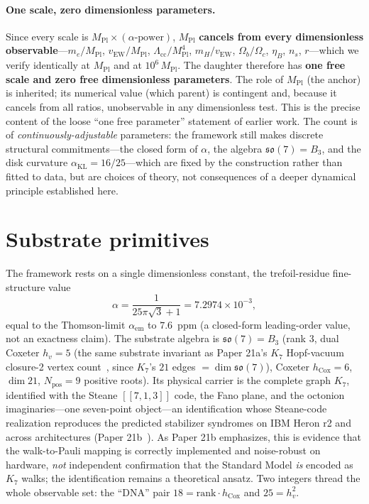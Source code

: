 \documentclass[11pt]{article}
\newcommand{\so}{\mathfrak{so}}
\newcommand{\HV}{h_v}
\newcommand{\hcox}{h_{\mathrm{Cox}}}
\newcommand{\Klogical}{[[7, 1, 3]]}
\newcommand{\Mpl}{M_{\mathrm{Pl}}}
\newcommand{\vEW}{v_{\mathrm{EW}}}
\newcommand{\Lcc}{\Lambda_{\mathrm{cc}}}
\begin{document}
\paragraph{One scale, zero dimensionless parameters.} Since every scale is $\Mpl \times (\alpha\text{-power})$, $\Mpl$ \textbf{cancels from every dimensionless observable}---$m_e/\Mpl$, $\vEW/\Mpl$, $\Lcc/\Mpl^4$, $m_H/\vEW$, $\Omega_b/\Omega_c$, $\eta_B$, $n_s$, $r$---which we verify identically at $\Mpl$ and at $10^6\,\Mpl$. The daughter therefore has \textbf{one free scale and zero free dimensionless parameters}. The role of $\Mpl$ (the anchor) is inherited; its numerical value (which parent) is contingent and, because it cancels from all ratios, unobservable in any dimensionless test. This is the precise content of the loose ``one free parameter'' statement of earlier work.  The count is of \emph{continuously-adjustable} parameters: the framework still makes discrete structural commitments---the closed form of $\alpha$, the algebra $\so(7) = B_3$, and the disk curvature $\alpha_{\mathrm{KL}} = 16/25$---which are fixed by the construction rather than fitted to data, but are choices of theory, not consequences of a deeper dynamical principle established here.

\section{Substrate primitives}
\label{sec:primitives}

The framework rests on a single dimensionless constant, the trefoil-residue fine-structure value
\[ \alpha = \frac{1}{25\pi\sqrt{3} + 1} = 7.2974\times10^{-3}, \]
equal to the Thomson-limit $\alpha_{\mathrm{em}}$ to $7.6$~ppm (a closed-form leading-order value, not an exactness claim). The substrate algebra is $\so(7) = B_3$ (rank $3$, dual Coxeter $\HV = 5$ (the same substrate invariant as Paper 21a's $K_7$ Hopf-vacuum closure-2 vertex count~\cite[\S 2]{Paper21a}, since $K_7$'s $21$ edges $= \dim\so(7)$), Coxeter $\hcox = 6$, $\dim 21$, $N_{\mathrm{pos}} = 9$ positive roots). Its physical carrier is the complete graph $K_7$, identified with the Steane $\Klogical$ code, the Fano plane, and the octonion imaginaries---one seven-point object---an identification whose Steane-code realization reproduces the predicted stabilizer syndromes on IBM Heron r2 and across architectures (Paper 21b~\cite{Paper21b}).  As Paper 21b emphasizes, this is evidence that the walk-to-Pauli mapping is correctly implemented and noise-robust on hardware, \emph{not} independent confirmation that the Standard Model \emph{is} encoded as $K_7$ walks; the identification remains a theoretical ansatz. Two integers thread the whole observable set: the ``DNA'' pair $18 = \text{rank}\cdot\hcox$ and $25 = \HV^2$.
\end{document}
